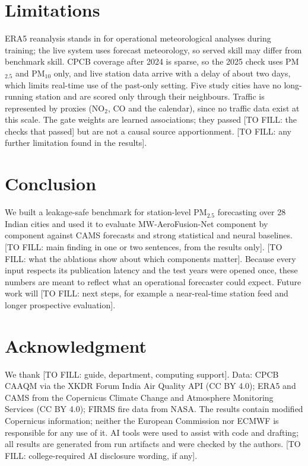 \documentclass[conference]{IEEEtran}
\newcommand{\blank}[1]{{\color{red!75!black}\sffamily\footnotesize[TO FILL: #1]}}
\begin{document}
\section{Limitations}
ERA5 reanalysis stands in for operational meteorological analyses during training; the live system uses forecast
meteorology, so served skill may differ from benchmark skill. CPCB coverage after 2024 is sparse, so the 2025 check uses
PM$_{2.5}$ and PM$_{10}$ only, and live station data arrive with a delay of about two days, which limits real-time use of
the past-only setting. Five study cities have no long-running station and are scored only through their neighbours.
Traffic is represented by proxies (NO$_2$, CO and the calendar), since no traffic data exist at this scale. The gate
weights are learned associations; they passed \blank{the checks that passed} but are not a causal source apportionment.
\blank{any further limitation found in the results}.

\section{Conclusion}
We built a leakage-safe benchmark for station-level PM$_{2.5}$ forecasting over 28 Indian cities and used it to evaluate
MW-AeroFusion-Net component by component against CAMS forecasts and strong statistical and neural baselines.
\blank{main finding in one or two sentences, from the results only}. \blank{what the ablations show about which components
matter}. Because every input respects its publication latency and the test years were opened once, these numbers are
meant to reflect what an operational forecaster could expect. Future work will \blank{next steps, for example a near-real-time
station feed and longer prospective evaluation}.

\section*{Acknowledgment}
We thank \blank{guide, department, computing support}. Data: CPCB CAAQM via the XKDR Forum India Air Quality API (CC BY 4.0);
ERA5 and CAMS from the Copernicus Climate Change and Atmosphere Monitoring Services (CC BY 4.0); FIRMS fire data from NASA.
The results contain modified Copernicus information; neither the European Commission nor ECMWF is responsible for any use
of it. AI tools were used to assist with code and drafting; all results are generated from run artifacts and were checked by
the authors. \blank{college-required AI disclosure wording, if any}.



\end{document}
